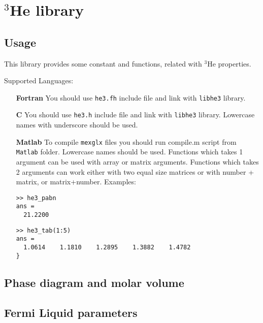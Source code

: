 \documentclass[a4paper]{article}
\begin{document}
\section{$^3$He library}

\subsection*{Usage}

This library provides some constant and functions, related with $^3$He properties.

Supported Languages:

\begin{itemize}

\item[\bf Fortran]
You should use {\tt he3.fh} include file and link with {\tt libhe3} library.

\item[\bf C]
You should use {\tt he3.h} include file and link with {\tt libhe3} library.
Lowercase names with underscore should be used.

\item[\bf Matlab]
To compile {\tt mexglx} files you should run compile.m script from {\tt Matlab}
folder. Lowercase names should be used.
Functions which takes 1 argument can be used with array or matrix arguments.
Functions which takes 2 arguments can work either with two equal size matrices
or with number + matrix, or matrix+number. Examples:

\begin{verbatim}
>> he3_pabn
ans =
  21.2200
\end{verbatim}

\begin{verbatim}
>> he3_tab(1:5)
ans =
  1.0614    1.1810    1.2895    1.3882    1.4782
}
\end{verbatim}

\end{itemize}

\subsection*{Phase diagram and molar volume}


\subsection*{Fermi Liquid parameters}
\end{document}
